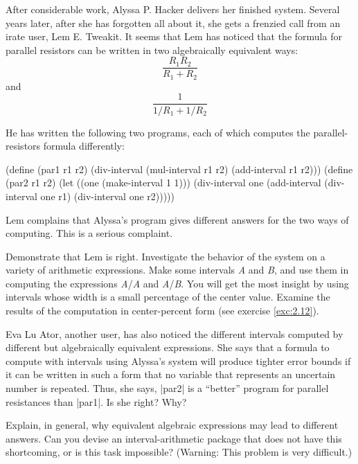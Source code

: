 \begin{Exercise}
After considerable work, Alyssa P. Hacker delivers her finished
system.  Several years later, after she has forgotten all about it, she
gets a frenzied call from an irate user,  Lem E. Tweakit.
It seems that Lem has
noticed that the formula for parallel resistors can be written in two
algebraically equivalent ways:  \[\frac{R_1R_2}{R_1 + R_2}\] and \[\frac{1}{1/R_1 + 1/R_2}\]

He has written the following two programs, each of which computes the
parallel-resistors formula differently:

\begin{schemedisplay}
(define (par1 r1 r2)
  (div-interval (mul-interval r1 r2)
                (add-interval r1 r2)))
(define (par2 r1 r2)
  (let ((one (make-interval 1 1))) 
    (div-interval one
                  (add-interval (div-interval one r1)
                                (div-interval one r2)))))
\end{schemedisplay}
Lem complains that Alyssa's program gives different answers for
the two ways of computing. This is a serious complaint.
\end{Exercise}
\begin{Exercise}
\label{exc:2.14}
Demonstrate that Lem is right. Investigate the behavior of the system
on a variety of arithmetic expressions. Make some intervals \textit{A}
and \textit{B}, and use them in computing the expressions
\textit{A}/\textit{A} and \textit{A}/\textit{B}.  You will get the
most insight by using intervals whose width is a small percentage of
the center value. Examine the results of the computation in
center-percent form (see exercise \ref{exc:2.12}).
\end{Exercise}

\begin{Exercise}
\label{exc:2.15}
Eva Lu Ator, another user, has also noticed the different intervals
computed by different but algebraically equivalent expressions. She
says that a formula to compute with intervals using Alyssa's system
will produce tighter error bounds if it can be written in such a form
that no variable that represents an uncertain number is repeated.
Thus, she says, \scheme|par2| is a ``better'' program for parallel
resistances than \scheme|par1|.  Is she right?  Why?
\end{Exercise}

\begin{Exercise}
\label{exc:2.16}
Explain, in general, why equivalent algebraic expressions may lead to
different answers.  Can you devise an interval-arithmetic package that
does not have this shortcoming, or is this task impossible?  (Warning:
This problem is very difficult.)
\end{Exercise}
